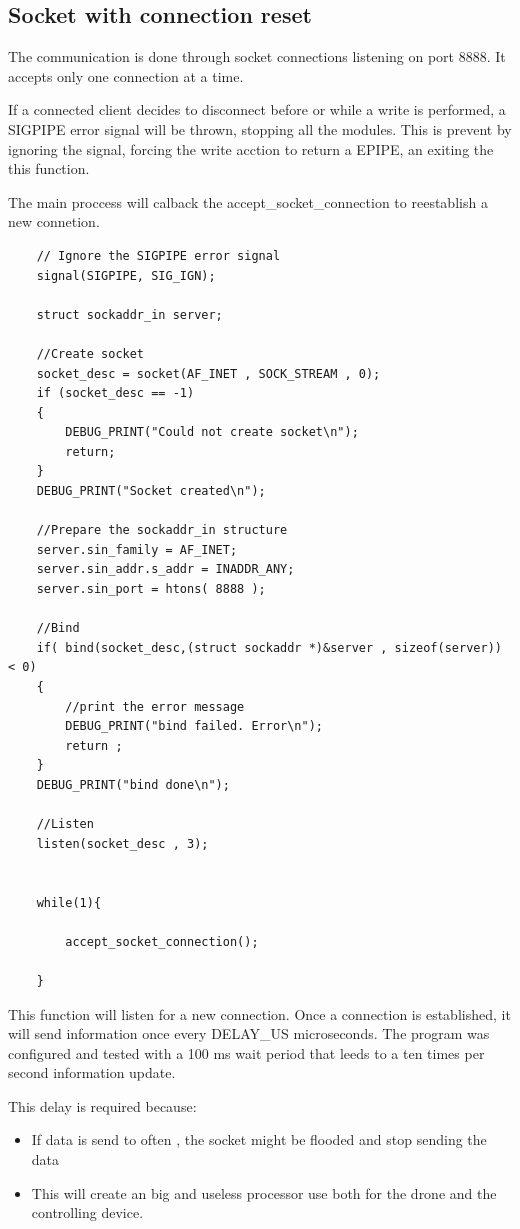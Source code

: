 \subsection{Socket with connection reset}

The communication is done through socket connections listening on port 8888. It accepts only one connection at a time.

If a connected client decides to disconnect before or while a write is performed, a SIGPIPE error signal will be thrown, stopping all the modules. This is prevent by ignoring the signal, forcing the write acction to return a EPIPE, an exiting the this function.

The main proccess will calback the accept\_socket\_connection to reestablish a new connetion.

\lstset{numbers=none, mathescape=true, nolol=false,caption=Data Collection use of mutex,label=lst:task}
\begin{lstlisting}
	// Ignore the SIGPIPE error signal
	signal(SIGPIPE, SIG_IGN);

    struct sockaddr_in server;

    //Create socket
    socket_desc = socket(AF_INET , SOCK_STREAM , 0);
    if (socket_desc == -1)
    {
        DEBUG_PRINT("Could not create socket\n");
		return;
    }
    DEBUG_PRINT("Socket created\n");
     
    //Prepare the sockaddr_in structure
    server.sin_family = AF_INET;
    server.sin_addr.s_addr = INADDR_ANY;
    server.sin_port = htons( 8888 );
     
    //Bind
    if( bind(socket_desc,(struct sockaddr *)&server , sizeof(server)) < 0)
    {
        //print the error message
        DEBUG_PRINT("bind failed. Error\n");
        return ;
    }
    DEBUG_PRINT("bind done\n");
     
    //Listen
    listen(socket_desc , 3);
     

	while(1){
	
		accept_socket_connection();
	
	}
\end{lstlisting}


This function will listen for a new connection. Once a connection is established, it will send information once every DELAY\_US microseconds. The program was configured and tested with a 100 ms wait period that leeds to a ten times per second information update.

This delay is required because:
\begin{itemize}

\item If data is send to often , the socket might be flooded and stop sending the data
\item This will create an big and useless processor use both for the drone and the controlling device.

\end{itemize}


